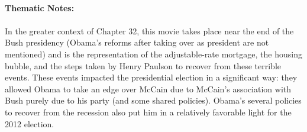 \documentclass{article}
\begin{document}
    \mbox{} \\ \textbf{Thematic Notes:} \\~\\
    In the greater context of Chapter 32, this movie takes place near the end of the Bush presidency (Obama's reforms after taking over as president are not mentioned) and is the representation of the adjustable-rate mortgage, the housing bubble, and the steps taken by Henry Paulson to recover from these terrible events. These events impacted the presidential election in a significant way: they allowed Obama to take an edge over McCain due to McCain's association with Bush purely due to his party (and some shared policies). Obama's several policies to recover from the recession also put him in a relatively favorable light for the 2012 election.

    
\end{document}
